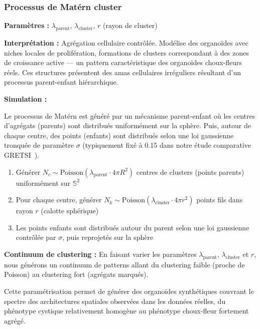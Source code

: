 \subsubsection{Processus de Matérn cluster}

\textbf{Paramètres :} $\lambda_{\text{parent}}$, $\lambda_{\text{cluster}}$, $r$ (rayon de cluster)

\textbf{Interprétation :} Agrégation cellulaire contrôlée. Modélise des organoïdes avec niches locales de prolifération, formations de clusters correspondant à des zones de croissance active — un pattern caractéristique des organoïdes choux-fleurs réels. Ces structures présentent des amas cellulaires irréguliers résultant d'un processus parent-enfant hiérarchique.

\textbf{Simulation :}

Le processus de Matérn est généré par un mécanisme parent-enfant où les centres d'agrégats (parents) sont distribués uniformément sur la sphère. Puis, autour de chaque centre, des points (enfants) sont distribués selon une loi gaussienne tronquée de paramètre $\sigma$ (typiquement fixé à 0.15 dans notre étude comparative GRETSI~\cite{Martin2025GRETSI2}).

\begin{enumerate}
    \item Générer $N_c \sim \text{Poisson}(\lambda_{\text{parent}} \cdot 4\pi R^2)$ centres de clusters (points parents) uniformément sur $\mathbb{S}^2$
    \item Pour chaque centre, générer $N_k \sim \text{Poisson}(\lambda_{\text{cluster}} \cdot 4\pi r^2)$ points fils dans rayon $r$ (calotte sphérique)
    \item Les points enfants sont distribués autour du parent selon une loi gaussienne contrôlée par $\sigma$, puis reprojetés sur la sphère
\end{enumerate}

\textbf{Continuum de clustering :}
En faisant varier les paramètres $\lambda_{\text{parent}}$, $\lambda_{\text{cluster}}$ et $r$, nous générons un continuum de patterns allant du clustering faible (proche de Poisson) au clustering fort (agrégats marqués).

Cette paramétrisation permet de générer des organoïdes synthétiques couvrant le spectre des architectures spatiales observées dans les données réelles, du phénotype cystique relativement homogène au phénotype choux-fleur fortement agrégé.


